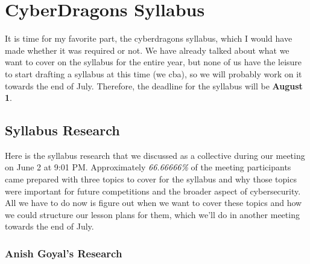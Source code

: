 \documentclass[
  letterpaper,
  DIV=11,
  numbers=noendperiod]{scrartcl}
\begin{document}
\newpage{}

\hypertarget{cyberdragons-syllabus}{%
\section{CyberDragons Syllabus}\label{cyberdragons-syllabus}}

It is time for my favorite part, the cyberdragons syllabus, which I
would have made whether it was required or not. We have already talked
about what we want to cover on the syllabus for the entire year, but
none of us have the leisure to start drafting a syllabus at this time
(we cba), so we will probably work on it towards the end of July.
Therefore, the deadline for the syllabus will be \textbf{August 1}.

\hypertarget{syllabus-research}{%
\subsection{Syllabus Research}\label{syllabus-research}}

Here is the syllabus research that we discussed as a collective during
our meeting on June 2 at 9:01 PM. Approximately \emph{66.66666\%} of the
meeting participants came prepared with three topics to cover for the
syllabus and why those topics were important for future competitions and
the broader aspect of cybersecurity. All we have to do now is figure out
when we want to cover these topics and how we could structure our lesson
plans for them, which we'll do in another meeting towards the end of
July.

\hypertarget{anish-goyals-research}{%
\subsubsection{Anish Goyal's Research}\label{anish-goyals-research}}
\end{document}
